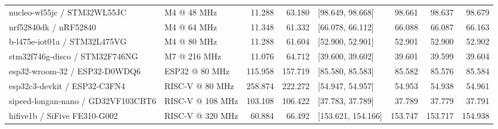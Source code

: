 \begin{table}[ht]
\begin{threeparttable}
\begin{tabular}{llrrlrrr}
nucleo-wl55jc   / STM32WL55JC  & M4 @ 48 MHz           & 11.288                       & 63.180                         & {[}98.649, 98.668{]}   & 98.661  & 98.637  & 98.679  \\
nrf52840dk   / nRF52840        & M4 @ 64 MHz           & 11.348                       & 61.332                        & {[}66.078, 66.112{]}   & 66.088  & 66.087  & 66.163  \\
b-l475e-iot01a   / STM32L475VG & M4 @ 80 MHz           & 11.288                       & 61.604                        & {[}52.900, 52.901{]}     & 52.901  & 52.900    & 52.902  \\
stm32f746g-disco / STM32F746NG       & M7 @ 216 MHz          & 11.076                       & 64.712                        & {[}39.600, 39.602{]}     & 39.601  & 39.599  & 39.604 \\\hline

esp32-wroom-32 / ESP32-D0WDQ6  & ESP32 @ 80 MHz       & 115.958                       & 157.719                        & {[}85.580, 85.583{]} & 85.582  & 85.576 & 85.584
\\
esp32c3-devkit / ESP32-C3FN4 &  RISC-V @ 80 MHz      &    258.874       &    222.272   & [54.947, 54.957]   &      54.953    &   54.938   &    54.961 \\
sipeed-longan-nano / GD32VF103CBT6  & RISC-V @ 108 MHz &     103.108     &    106.422 & [37.783, 37.789]   &   37.789   &    37.779    &   37.791 \\
hifive1b / SiFive FE310-G002  & RISC-V @ 320 MHz       & 60.884                       & 66.492                        & {[}153.621, 154.166{]} & 153.747 & 153.717 & 154.938 \\
\hline
\end{tabular}

\end{threeparttable}
\end{table}

